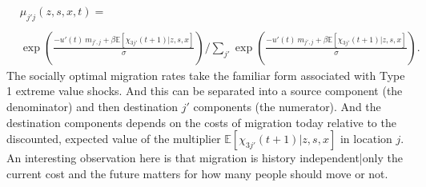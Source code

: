 \documentclass[12pt,pdftex]{article}
\begin{document}
{\small
\begin{align}
& \mu_{j'j}(z,s,x,t) =  \nonumber \\
\nonumber \\
&\exp \left(\frac{- u'(t) \ m_{j',j} + \beta\mathbb{E}\left[\chi_{3j'}(t+1)| z, s,x \right]}{\sigma} \right)  \Bigg / \sum_{j'} \exp \left( \frac{-u'(t)\ m_{j',j} + \beta\mathbb{E}\left[\chi_{3j'}(t+1)| z,s,x \right]}{\sigma} \right).
\end{align}}The socially optimal migration rates take the familiar form associated with Type 1 extreme value shocks. And this can be separated into a source component (the denominator) and then destination $j'$ components (the numerator). And the destination components depends on the costs of migration today relative to the discounted, expected value of the multiplier $\mathbb{E}\left[\chi_{3j'}(t+1)|z, s,x \right]$ in location $j$. An interesting observation here is that migration is history independent|only the current cost and the future matters for how many people should move or not.
\end{document}
